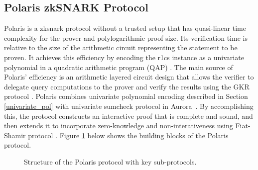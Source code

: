 \subsection{Polaris zkSNARK Protocol} \label{sec:prel_polaris}


Polaris \cite{Polaris} is a \gls{zksnark} protocol without a trusted setup that has quasi-linear time complexity for the prover and polylogarithmic proof size. Its verification time is relative to the size of the arithmetic circuit representing the statement to be proven. It achieves this efficiency by encoding the \gls{r1cs} instance as a univariate polynomial in a quadratic arithmetic program (QAP) \cite{GGPR13}. The main source of Polaris' efficiency is an arithmetic layered circuit design that allows the verifier to delegate query computations to the prover and verify the results using the GKR protocol \cite{GKR2008}. 
Polaris combines univariate polynomial encoding described in Section \ref{univariate_pol} with univariate sumcheck protocol in Aurora~\cite{Aurora2019}.
By accomplishing this, the protocol constructs an interactive proof that is complete and sound, and then extends it to incorporate zero-knowledge and non-interativeness using Fiat-Shamir protocol \cite{Fiat1987}. Figure \ref{fig:polaris-blocks} below shows the building blocks of the Polaris protocol.

\begin{figure}[h]
	\centering
	
	\caption{
		Structure of the Polaris protocol with key sub-protocols. }
	\label{fig:polaris-blocks}
\end{figure}


